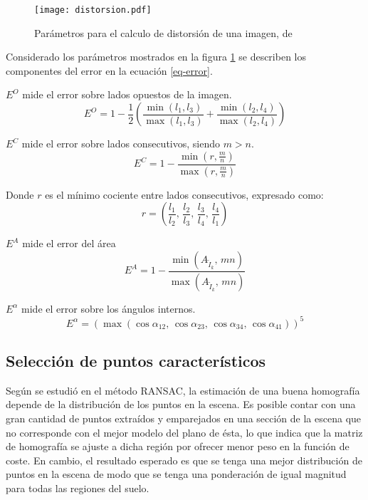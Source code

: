 \begin{figure}[h]
	\centering
	\texttt{[image: distorsion.pdf]}
	\caption[Distorsion de imagen]{Parámetros para el calculo de distorsión de una imagen, de \cite{bellavia-ref}}
	\label{imagen:distorsion}
\end{figure}

Considerado los parámetros mostrados en la figura \ref{imagen:distorsion} se describen los componentes del error en la ecuación \ref{eq-error}.

$E^O$ mide el error sobre lados opuestos de la imagen.
\begin{equation}
E^O = 1 - \frac{1}{2}  \left(  \frac{\min (l_1, l_3)}{\max (l_1, l_3)} +  \frac{\min (l_2, l_4)}{\max (l_2, l_4)} \right)
\end{equation}

$E^C$ mide el error sobre lados consecutivos, siendo $m > n$.
\begin{equation}
E^C = 1 - \frac{\min (r, \frac{m}{n})}{\max (r, \frac{m}{n})}
\end{equation}

Donde $r$ es el mínimo cociente entre lados consecutivos, expresado como:
\begin{displaymath}
r = \left( \frac{l_1}{l_2},\, \frac{l_2}{l_3},\, \frac{l_3}{l_4},\, \frac{l_4}{l_1} \right)
\end{displaymath}

$E^A$ mide el error del área
\begin{equation}
E^A = 1 - \frac{\min (A_{\tilde{I}_k},\, mn)}{\max (A_{\tilde{I}_k},\, mn)}
\end{equation}

$E^\alpha$ mide el error sobre los ángulos internos. 
\begin{equation}
E^\alpha = (\max (\cos\alpha_{12},\, \cos\alpha_{23},\, \cos\alpha_{34},\, \cos\alpha_{41}))^5
\end{equation}


\subsection{Selección de puntos característicos}\label{seleccion-grid}

Según se estudió en el método RANSAC, la estimación de una buena homografía depende de la distribución de los puntos en la escena. Es posible contar con una gran cantidad de puntos extraídos y emparejados en una sección de la escena que no corresponde con el mejor modelo del plano de ésta, lo que indica que la matriz de homografía se ajuste a dicha región por ofrecer menor peso en la función de coste. En cambio, el resultado esperado es que se tenga una mejor distribución de puntos en la escena de modo que se tenga una ponderación de igual magnitud para todas las regiones del suelo.

